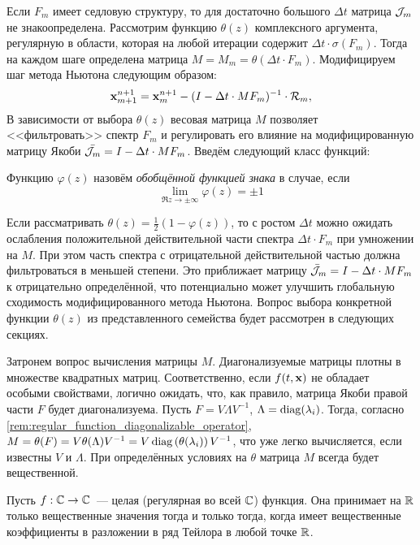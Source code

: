 Если $ F_m $ имеет седловую структуру, то для достаточно большого $ \Delta t $ матрица $ \mathcal{J}_m $ не знакоопределена.
Рассмотрим функцию $ \theta(z) $ комплексного аргумента, регулярную в области, которая на любой итерации содержит $ \Delta t \cdot \sigma(F_m) $.
Тогда на каждом шаге определена матрица $ M = M_m = \theta(\Delta t \cdot F_m) $.
Модифицируем шаг метода Ньютона следующим образом:
%
\begin{equation}
    \label{eq:modified_Newton_iteration}
    \mathbf{x}_{m+1}^{n+1} = \mathbf{x}_m^{n+1} - (I - \Delta t \cdot M F_m)^{-1} \cdot \mathcal{R}_m,
\end{equation}
%
В зависимости от выбора $ \theta(z) $ весовая матрица $ M $ позволяет <<фильтровать>> спектр $ F_m $
и регулировать его влияние на модифицированную матрицу Якоби $ \bar{\mathcal{J}_m} = I - \Delta t \cdot M F_m $.
Введём следующий класс функций:

\begin{definition}
    \label{def:generalized_sign_function}
    Функцию $ \varphi(z) $ назовём \emph{обобщённой функцией знака} в случае, если
    \[
        \lim_{\Re z \to \pm \infty} \varphi(z) = \pm 1
    \]
\end{definition}

Если рассматривать $ \theta(z) = \frac{1}{2} (1 - \varphi(z)) $,
то с ростом $ \Delta t $ можно ожидать ослабления положительной действительной части спектра $ \Delta t \cdot F_m $ при умножении на $ M $.
При этом часть спектра с отрицательной действительной частью должна фильтроваться в меньшей степени.
Это приближает матрицу $ \bar{\mathcal{J}}_m = I - \Delta t \cdot M F_m $ к отрицательно определённой,
что потенциально может улучшить глобальную сходимость модифицированного метода Ньютона.
Вопрос выбора конкретной функции $ \theta(z) $ из представленного семейства будет рассмотрен в следующих секциях.

Затронем вопрос вычисления матрицы $ M $.
Диагонализуемые матрицы плотны в множестве квадратных матриц.
Соответственно, если $ f(t, \mathbf{x}) $ не обладает особыми свойствами, логично ожидать, что, как правило,
матрица Якоби правой части $ F $ будет диагонализуема.
Пусть $ F = V \Lambda V^{-1} $, $ \Lambda = \operatorname{diag}(\lambda_i) $.
Тогда, согласно \ref{rem:regular_function_diagonalizable_operator}, $ M = \theta(F) = V \theta(\Lambda) V^{-1} = V \operatorname{diag}\left( \theta(\lambda_i) \right) V^{-1} $,
что уже легко вычисляется, если известны $ V $ и $ \Lambda $.
При определённых условиях на $ \theta $ матрица $ M $ всегда будет вещественной.

\begin{statement}
    \label{stat:whole_real_function}
    Пусть $ f: \mathbb{C} \to \mathbb{C} $~--- целая (регулярная во всей $ \mathbb{C} $) функция.
    Она принимает на $ \mathbb{R} $ только вещественные значения тогда и только тогда,
    когда имеет вещественные коэффициенты в разложении в ряд Тейлора в любой точке $ \mathbb{R} $.
\end{statement}

